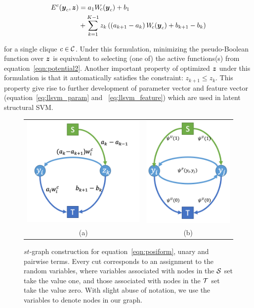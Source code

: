 \documentclass[sigconf,anonymous,review]{acmart}
\begin{document}
\begin{align}
  E^c({\boldsymbol{y}}_c, {\boldsymbol{z}}) &= a_1 W_{\!c}({\boldsymbol{y}}_c) + b_1 \notag \\
  &+ \sum_{k = 1}^{K-1} z_k \left( \left(a_{k+1} - a_k\right) W_{\!c}({\boldsymbol{y}}_c) + b_{k+1} - b_k \right)
  \label{eqn:binary_concave_z}
\end{align}

\noindent for a single clique $c \in \cal C$. Under this formulation,
minimizing the pseudo-Boolean function over ${\boldsymbol{z}}$ is equivalent
to selecting (one of) the active functions(s) from
equation~\eqref{eqn:potential2}. Another important property of
optimized ${\boldsymbol{z}}$ under this formulation is that it automatically
satisfies the constraint: $z_{k+1} \leq z_k$. This property give rise to further development of
parameter vector and feature
vector (equation~\eqref{eq:llsvm_param} and ~\eqref{eq:llsvm_feature})
which are used in latent
structural SVM.

\begin{figure}[t]
  \centering
  \setlength{\tabcolsep}{2pt}
  \begin{tabular}{cc}
    \includegraphics[width=0.54\columnwidth]{Methodology/figures/ho.png}&
                                                                         \includegraphics[width=0.4\columnwidth]{Methodology/figures/up.png}\\
                                                                         {\small (a)} & {\small (b)} 
  \end{tabular}
  \caption{\label{fig:stmincut} $st$-graph construction for
    equation~\eqref{eqn:posiform}, unary and pairwise terms.
    Every cut corresponds to an assignment to the random
    variables, where variables associated with nodes in the
    ${\cal S}$ set take the value one, and those associated with
    nodes in the $\T$ set take the value zero. With slight abuse
    of notation, we use the variables to denote nodes in our
    graph.}
\end{figure}
\end{document}
